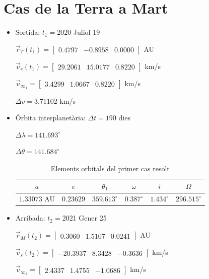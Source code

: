 \section{Cas de la Terra a Mart}
\begin{itemize}
	\item Sortida: $t_{1}=$2020 Juliol 19

$\vec{r}_{T}(t_{1})=\begin{bmatrix}0.4797 & -0.8958 & 0.0000\end{bmatrix}$ AU

$\vec{v}_{s}(t_{1})=\begin{bmatrix}29.2061 & 15.0177 & 0.8220\end{bmatrix}$ km/s

$\vec{v}_{\infty_{1}}= \begin{bmatrix}3.4299 & 1.0667 & 0.8220\end{bmatrix}$ km/s

$\Delta v=3.71102$ km/s

	\item Òrbita interplanetària: $\Delta t=190$ dies

$\Delta\lambda=141.693^{\circ}$

$\Delta\theta=141.684^{\circ}$
\begin{table}[H]
	\centering
	\begin{tabular}{ |c|c|c|c|c|c|}
		\hline
		$a$ & $e$ & $\theta_{1}$ & $\omega$ & $i$ & $\Omega$ \\ \hline
		$1.33073$ AU  & $0.23629$ & $359.613^{\circ}$ & $0.387^{\circ}$ & $1.434^{\circ}$ & $296.515^{\circ}$ \\ \hline
	\end{tabular}
	\caption{Elements orbitals del primer cas resolt}
\end{table}
	\item Arribada: $t_{2}=$2021 Gener 25

$\vec{r}_{M}(t_{2})=\begin{bmatrix}0.3060 & 1.5107 & 0.0241\end{bmatrix}$ AU

$\vec{v}_{s}(t_{2})=\begin{bmatrix}-20.3937 & 8.3428 & -0.3636\end{bmatrix}$ km/s


$\vec{v}_{\infty_{2}}=\begin{bmatrix}2.4337 & 1.4755 & -1.0686\end{bmatrix}$ km/s
\end{itemize}
